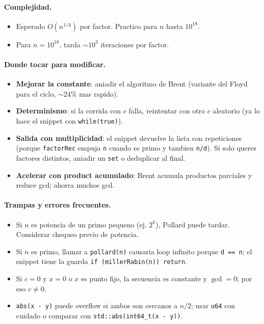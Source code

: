 \paragraph{Complejidad.}
\begin{itemize}\setlength\itemsep{0pt}
	\item Esperado $O(n^{1/4})$ por factor. Practico para $n$ hasta $10^{18}$.
	\item Para $n = 10^{18}$, tarda $\sim 10^3$ iteraciones por factor.
\end{itemize}

\paragraph{Donde tocar para modificar.}
\begin{itemize}\setlength\itemsep{0pt}
	\item \textbf{Mejorar la constante}: aniadir el algoritmo de Brent (variante del Floyd para el ciclo, $\sim 24\%$ mas rapido).
	\item \textbf{Determinismo}: si la corrida con $c$ falla, reintentar con otro $c$ aleatorio (ya lo hace el snippet con \texttt{while(true)}).
	\item \textbf{Salida con multiplicidad}: el snippet devuelve la lista con repeticiones (porque \texttt{factorRec} empuja \texttt{n} cuando es primo y tambien \texttt{n/d}). Si solo queres factores distintos, aniadir un \texttt{set} o deduplicar al final.
	\item \textbf{Acelerar con product acumulado}: Brent acumula productos parciales y reduce gcd; ahorra muchos gcd.
\end{itemize}

\paragraph{Trampas y errores frecuentes.}
\begin{itemize}\setlength\itemsep{0pt}
	\item Si $n$ es potencia de un primo pequeno (ej. $2^k$), Pollard puede tardar. Considerar chequeo previo de potencia.
	\item Si $n$ es primo, llamar a \texttt{pollard(n)} causaria loop infinito porque \texttt{d == n}; el snippet tiene la guarda \texttt{if (millerRabin(n)) return}.
	\item Si $c = 0$ y $x = 0$ o $x$ es punto fijo, la secuencia es constante y $\gcd = 0$; por eso $c \ne 0$.
	\item \texttt{abs(x - y)} puede overflow si ambos son cercanos a $n/2$; usar \texttt{u64} con cuidado o comparar con \texttt{std::abs(int64\_t(x - y))}.
\end{itemize}

